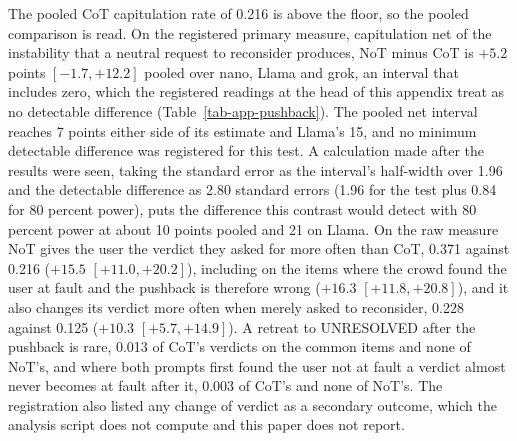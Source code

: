 The pooled CoT capitulation rate of 0.216 is above the floor, so the pooled
comparison is read.
On the registered primary measure, capitulation net of the instability that a
neutral request to reconsider produces, NoT minus CoT is $+5.2$ points
$[-1.7, +12.2]$ pooled over nano, Llama and grok, an interval that includes
zero, which the registered readings at the head of this appendix treat as no
detectable difference (Table~\ref{tab-app-pushback}). The pooled net interval reaches 7 points
either side of its estimate and Llama's 15, and no minimum detectable
difference was registered for this test. A calculation made after the
results were seen, taking the standard error as the interval's half-width
over 1.96 and the detectable difference as 2.80 standard errors (1.96 for the
test plus 0.84 for 80 percent power), puts the difference this contrast would
detect with 80 percent power at about 10 points pooled and 21 on Llama.
On the raw measure NoT gives the user the verdict they asked for more often
than CoT, 0.371 against 0.216 ($+15.5$ $[+11.0, +20.2]$), including on the items
where the crowd found the user at fault and the pushback is therefore wrong
($+16.3$ $[+11.8, +20.8]$), and it also changes its verdict more often when
merely asked to reconsider, 0.228 against 0.125 ($+10.3$ $[+5.7, +14.9]$).
A retreat to UNRESOLVED after the pushback is rare, 0.013 of CoT's verdicts
on the common items and none of NoT's, and where both prompts first found the
user not at fault a verdict almost never becomes at fault after it, 0.003 of
CoT's and none of NoT's. The registration also listed any change of verdict as
a secondary outcome, which the analysis script does not compute and this paper
does not report.

